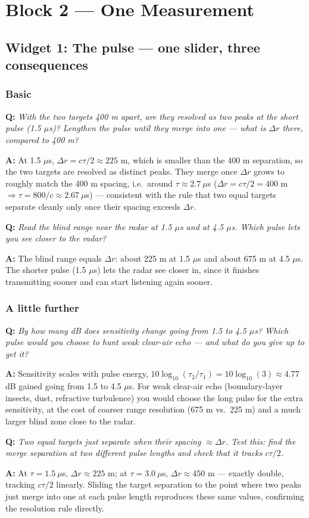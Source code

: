\documentclass[11pt]{article}
\newenvironment{qa}[1]{\par\noindent\textbf{\color{qgray}Q: }\emph{#1}\par\noindent\textbf{A: }}{\par\vspace{6pt}}
\newcommand{\tier}[1]{\subsubsection*{#1}}
\begin{document}
\section{Block 2 --- One Measurement}

\subsection{Widget 1: The pulse --- one slider, three consequences}

\tier{Basic}
\begin{qa}{With the two targets 400 m apart, are they resolved as two peaks at the short pulse (1.5 $\mu$s)? Lengthen the pulse until they merge into one --- what is $\Delta r$ there, compared to 400 m?}
At 1.5 $\mu$s, $\Delta r = c\tau/2 \approx225$ m, which is smaller than the 400 m separation, so the two targets are resolved as distinct peaks. They merge once $\Delta r$ grows to roughly match the 400 m spacing, i.e.\ around $\tau\approx2.7\ \mu$s ($\Delta r=c\tau/2=400$ m $\Rightarrow \tau = 800/c \approx 2.67\ \mu$s) --- consistent with the rule that two equal targets separate cleanly only once their spacing exceeds $\Delta r$.
\end{qa}
\begin{qa}{Read the blind range near the radar at 1.5 $\mu$s and at 4.5 $\mu$s. Which pulse lets you see closer to the radar?}
The blind range equals $\Delta r$: about 225 m at 1.5 $\mu$s and about 675 m at 4.5 $\mu$s. The shorter pulse (1.5 $\mu$s) lets the radar see closer in, since it finishes transmitting sooner and can start listening again sooner.
\end{qa}

\tier{A little further}
\begin{qa}{By how many dB does sensitivity change going from 1.5 to 4.5 $\mu$s? Which pulse would you choose to hunt weak clear-air echo --- and what do you give up to get it?}
Sensitivity scales with pulse energy, $10\log_{10}(\tau_2/\tau_1)=10\log_{10}(3)\approx4.77$ dB gained going from 1.5 to 4.5 $\mu$s. For weak clear-air echo (boundary-layer insects, dust, refractive turbulence) you would choose the long pulse for the extra sensitivity, at the cost of coarser range resolution (675 m vs.\ 225 m) and a much larger blind zone close to the radar.
\end{qa}
\begin{qa}{Two equal targets just separate when their spacing $\approx\Delta r$. Test this: find the merge separation at two different pulse lengths and check that it tracks $c\tau/2$.}
At $\tau=1.5\ \mu$s, $\Delta r\approx225$ m; at $\tau=3.0\ \mu$s, $\Delta r\approx450$ m --- exactly double, tracking $c\tau/2$ linearly. Sliding the target separation to the point where two peaks just merge into one at each pulse length reproduces these same values, confirming the resolution rule directly.
\end{qa}
\end{document}
